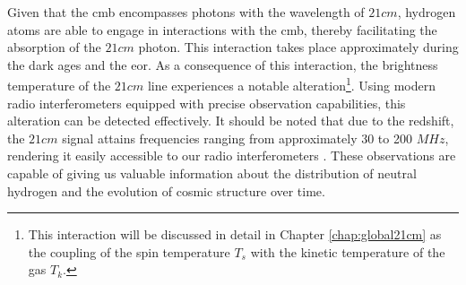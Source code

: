 \documentclass[12pt, TexShade, letterpaper]{report}
\begin{document}
Given that the \gls{cmb} encompasses photons with the wavelength of $21cm$, hydrogen atoms are able to engage in interactions with the \gls{cmb}, thereby facilitating the absorption of the $21cm$ photon. This interaction takes place approximately during the dark ages and the \gls{eor}. As a consequence of this interaction, the brightness temperature of the $21cm$ line experiences a notable alteration\footnote{This interaction will be discussed in detail in Chapter \ref{chap:global21cm} as the coupling of the spin temperature $T_s$ with the kinetic temperature of the gas $T_k$.}. Using modern radio interferometers equipped with precise observation capabilities, this alteration can be detected effectively. It should be noted that due to the redshift, the $21cm$ signal attains frequencies ranging from approximately 30 to 200 $MHz$, rendering it easily accessible to our radio interferometers \cite{low_frequency}. These observations are capable of giving us valuable information about the distribution of neutral hydrogen and the evolution of cosmic structure over time\cite{low_frequency}.\par
\end{document}
